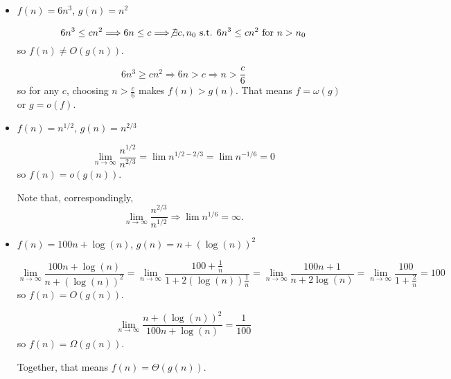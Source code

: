 \documentclass{article}
\begin{document}
\begin{itemize}
\vspace{1pc}
\item $f(n) = 6n^3$, $g(n) = n^2$

\[
  6n^3 \le cn^2
\Longrightarrow
  6n \le c
\Longrightarrow
  \not\exists c, n_0 \mbox{ s.t. } 6n^3 \le cn^2 \mbox{ for } n>n_0
\]
so $f(n)\ne O(g(n))$.

\[
  6n^3 \ge cn^2
\Longrightarrow
  6n > c
\Longrightarrow
  n > \frac{c}{6}
\]
so for any $c$, choosing $n > \frac{c}{6}$ makes $f(n) > g(n)$.
That means $f=\omega(g)$ or $g = o(f)$.

\vspace{1pc}
\item $f(n) = n^{1/2}$, $g(n) = n^{2/3}$

\[
  \lim_{n\rightarrow\infty}\frac{n^{1/2}}{n^{2/3}}
=
  \lim n^{1/2-2/3}
=
  \lim n^{-1/6}
=
  0
\]
so $f(n)=o(g(n))$.

Note that, correspondingly,
\[
  \lim_{n\rightarrow\infty}\frac{n^{2/3}}{n^{1/2}}
\Longrightarrow
  \lim n^{1/6} = \infty.
\]

\vspace{1pc}
\item $f(n) = 100n + \log(n)$, $g(n) = n + (\log(n))^2$

\[
  \lim_{n\rightarrow\infty} \frac{100n + \log(n)}{n + (\log(n))^2}
=
  \lim_{n\rightarrow\infty} \frac{100 + \frac{1}{n}}{1 + 2(\log(n))\frac{1}{n}}
=
  \lim_{n\rightarrow\infty} \frac{100n + 1}{n + 2\log(n)}
=
  \lim_{n\rightarrow\infty} \frac{100}{1 + \frac{2}{n}} = 100
\]
so $f(n) = O(g(n))$.

\[
  \lim_{n\rightarrow\infty} \frac{n + (\log(n))^2}{100n + \log(n)}
=
  \frac{1}{100}
\]
so $f(n) = \Omega(g(n))$.

Together, that means $f(n) = \Theta(g(n))$.


\end{itemize}
\end{document}
